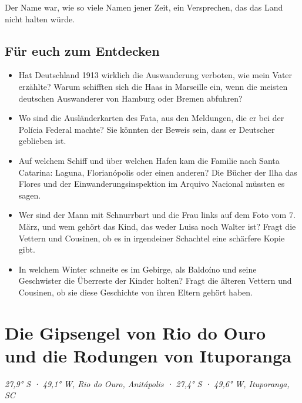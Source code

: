 \documentclass[
  ngerman,
  11pt,
  openany]{book}
\providecommand{\tightlist}{%
  \setlength{\itemsep}{0pt}\setlength{\parskip}{0pt}}
\begin{document}
Der Name war, wie so viele Namen jener Zeit, ein Versprechen, das das
Land nicht halten würde.

\section{Für euch zum Entdecken}\label{fuxfcr-euch-zum-entdecken-4}

\begin{itemize}
\tightlist
\item
  Hat Deutschland 1913 wirklich die Auswanderung verboten, wie mein
  Vater erzählte? Warum schifften sich die Haas in Marseille ein, wenn
  die meisten deutschen Auswanderer von Hamburg oder Bremen abfuhren?
\item
  Wo sind die Ausländerkarten des Fata, aus den Meldungen, die er bei
  der Polícia Federal machte? Sie könnten der Beweis sein, dass er
  Deutscher geblieben ist.
\item
  Auf welchem Schiff und über welchen Hafen kam die Familie nach Santa
  Catarina: Laguna, Florianópolis oder einen anderen? Die Bücher der
  Ilha das Flores und der Einwanderungsinspektion im Arquivo Nacional
  müssten es sagen.
\item
  Wer sind der Mann mit Schnurrbart und die Frau links auf dem Foto vom
  7. März, und wem gehört das Kind, das weder Luisa noch Walter ist?
  Fragt die Vettern und Cousinen, ob es in irgendeiner Schachtel eine
  schärfere Kopie gibt.
\item
  In welchem Winter schneite es im Gebirge, als Baldoíno und seine
  Geschwister die Überreste der Kinder holten? Fragt die älteren Vettern
  und Cousinen, ob sie diese Geschichte von ihren Eltern gehört haben.
\end{itemize}

\chapter{Die Gipsengel von Rio do Ouro und die Rodungen von
Ituporanga}\label{cap-6}

\emph{27,9° S · 49,1° W, Rio do Ouro, Anitápolis · 27,4° S · 49,6° W,
Ituporanga, SC}
\end{document}
